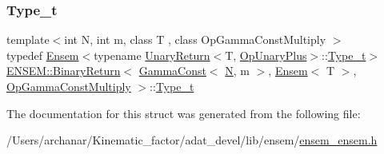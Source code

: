 \subsubsection{\texorpdfstring{Type\_t}{Type\_t}\hspace{0.1cm}{\footnotesize\ttfamily [2/2]}}
{\footnotesize\ttfamily template$<$int N, int m, class T , class Op\+Gamma\+Const\+Multiply $>$ \\
typedef \mbox{\hyperlink{classENSEM_1_1Ensem}{Ensem}}$<$typename \mbox{\hyperlink{structENSEM_1_1UnaryReturn}{Unary\+Return}}$<$T, \mbox{\hyperlink{structENSEM_1_1OpUnaryPlus}{Op\+Unary\+Plus}}$>$\+::\mbox{\hyperlink{structENSEM_1_1BinaryReturn_3_01GammaConst_3_01N_00_01m_01_4_00_01Ensem_3_01T_01_4_00_01OpGammaConstMultiply_01_4_a8e262cef580a83da22ae92176027df7c}{Type\+\_\+t}}$>$ \mbox{\hyperlink{structENSEM_1_1BinaryReturn}{E\+N\+S\+E\+M\+::\+Binary\+Return}}$<$ \mbox{\hyperlink{classENSEM_1_1GammaConst}{Gamma\+Const}}$<$ \mbox{\hyperlink{operator__name__util_8cc_a7722c8ecbb62d99aee7ce68b1752f337}{N}}, m $>$, \mbox{\hyperlink{classENSEM_1_1Ensem}{Ensem}}$<$ T $>$, \mbox{\hyperlink{structENSEM_1_1OpGammaConstMultiply}{Op\+Gamma\+Const\+Multiply}} $>$\+::\mbox{\hyperlink{structENSEM_1_1BinaryReturn_3_01GammaConst_3_01N_00_01m_01_4_00_01Ensem_3_01T_01_4_00_01OpGammaConstMultiply_01_4_a8e262cef580a83da22ae92176027df7c}{Type\+\_\+t}}}



The documentation for this struct was generated from the following file\+:\begin{DoxyCompactItemize}
\item 
/\+Users/archanar/\+Kinematic\+\_\+factor/adat\+\_\+devel/lib/ensem/\mbox{\hyperlink{lib_2ensem_2ensem__ensem_8h}{ensem\+\_\+ensem.\+h}}\end{DoxyCompactItemize}

